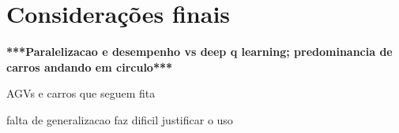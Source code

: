 \chapter{Considerações finais}


\textbf{***Paralelizacao e desempenho vs deep q learning; predominancia de carros andando em circulo***}

AGVs e carros que seguem fita

falta de generalizacao faz dificil justificar o uso

\lipsum[31-33]
